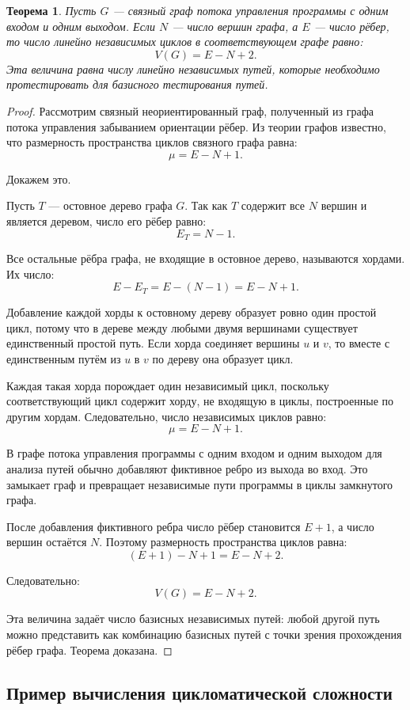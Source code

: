\documentclass[12pt,a4paper]{article}
\newtheorem{theorem}{Теорема}
\begin{document}
\begin{theorem}
Пусть $G$ --- связный граф потока управления программы с одним входом и одним выходом. Если $N$ --- число вершин графа, а $E$ --- число рёбер, то число линейно независимых циклов в соответствующем графе равно:
\[
V(G)=E-N+2.
\]
Эта величина равна числу линейно независимых путей, которые необходимо протестировать для базисного тестирования путей.
\end{theorem}

\begin{proof}
Рассмотрим связный неориентированный граф, полученный из графа потока управления забыванием ориентации рёбер. Из теории графов известно, что размерность пространства циклов связного графа равна:
\[
\mu = E - N + 1.
\]

Докажем это.

Пусть $T$ --- остовное дерево графа $G$. Так как $T$ содержит все $N$ вершин и является деревом, число его рёбер равно:
\[
E_T = N - 1.
\]

Все остальные рёбра графа, не входящие в остовное дерево, называются хордами. Их число:
\[
E - E_T = E - (N-1)=E-N+1.
\]

Добавление каждой хорды к остовному дереву образует ровно один простой цикл, потому что в дереве между любыми двумя вершинами существует единственный простой путь. Если хорда соединяет вершины $u$ и $v$, то вместе с единственным путём из $u$ в $v$ по дереву она образует цикл.

Каждая такая хорда порождает один независимый цикл, поскольку соответствующий цикл содержит хорду, не входящую в циклы, построенные по другим хордам. Следовательно, число независимых циклов равно:
\[
\mu = E-N+1.
\]

В графе потока управления программы с одним входом и одним выходом для анализа путей обычно добавляют фиктивное ребро из выхода во вход. Это замыкает граф и превращает независимые пути программы в циклы замкнутого графа.

После добавления фиктивного ребра число рёбер становится $E+1$, а число вершин остаётся $N$. Поэтому размерность пространства циклов равна:
\[
(E+1)-N+1 = E-N+2.
\]

Следовательно:
\[
V(G)=E-N+2.
\]

Эта величина задаёт число базисных независимых путей: любой другой путь можно представить как комбинацию базисных путей с точки зрения прохождения рёбер графа. Теорема доказана.
\end{proof}

\subsection{Пример вычисления цикломатической сложности}
\end{document}
